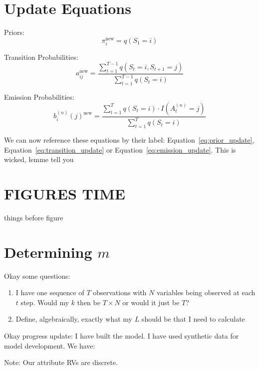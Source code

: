 \section{Update Equations}
Priors:
\begin{equation}
\pi_i^{\text{new}} = q(S_1=i)
\label{eq:prior_update}
\end{equation}

Transition Probabilities:
\begin{equation}
a_{ij}^{\text{new}} = \frac{\sum\limits_{t=1}^{T - 1} q(S_t=i,S_{t+1}=j)}{\sum\limits_{t=1}^{T-1} q(S_t=i)}
\label{eq:transition_update}
\end{equation}


Emission Probabilities:
\begin{equation}
b_i^{(n)}(j)^{\text{new}} = \frac{\sum\limits_{t=1}^T q(S_t = i) \cdot I(A_t^{(n)} = j)}{\sum\limits_{t=1}^T q(S_t = i)}
\label{eq:emission_update}
\end{equation}

We can now reference these equations by their label: Equation~\ref{eq:prior_update}, Equation~\ref{eq:transition_update} or Equation~\ref{eq:emission_update}. This is wicked, lemme tell you

\newpage

\section{FIGURES TIME}

things before figure



\section{Determining $m$}

Okay some questions:
\begin{enumerate}
    \item I have one sequence of $T$ observations with $N$ variables being observed at each $t$ step. Would my $k$ then be $T \times N$ or would it just be $T$?
    \item Define, algebraically, exactly what my $L$ should be that I need to calculate
\end{enumerate}

Okay progress update:
I have built the model. I have used synthetic data for model development. We have:


Note: Our attribute RVs are discrete. 

